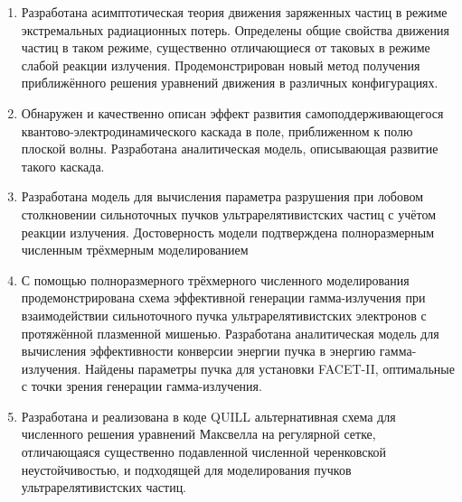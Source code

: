 \begin{enumerate}[beginpenalty=10000] %
  \item Разработана асимптотическая теория движения заряженных частиц в режиме экстремальных радиационных потерь. Определены общие свойства движения частиц в таком режиме, существенно отличающиеся от таковых в режиме слабой реакции излучения. Продемонстрирован новый метод получения приближённого решения уравнений движения в различных конфигурациях.
  \item Обнаружен и качественно описан эффект развития самоподдерживающегося квантово-электродинамического каскада в поле, приближенном к полю плоской волны. Разработана аналитическая модель, описывающая развитие такого каскада.
  \item Разработана модель для вычисления параметра разрушения при лобовом столкновении сильноточных пучков ультрарелятивистских частиц с учётом реакции излучения. Достоверность модели подтверждена полноразмерным численным трёхмерным моделированием
  \item С помощью полноразмерного трёхмерного численного моделирования продемонстрирована схема эффективной генерации гамма-излучения при взаимодействии сильноточного пучка ультрарелятивистских электронов с протяжённой плазменной мишенью. Разработана аналитическая модель для вычисления эффективности конверсии энергии пучка в энергию гамма-излучения. Найдены параметры пучка для установки FACET-II, оптимальные с точки зрения генерации гамма-излучения.
  \item Разработана и реализована в коде QUILL альтернативная схема для численного решения уравнений Максвелла на регулярной сетке, отличающаяся существенно подавленной численной черенковской неустойчивостью, и подходящей для моделирования пучков ультрарелятивистских частиц.
\end{enumerate}

